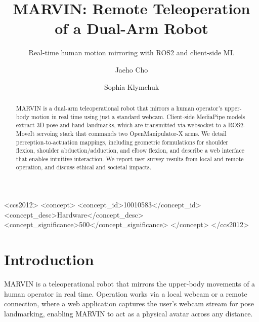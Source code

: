\documentclass[acmsmall, screen]{acmart}
\begin{document}
\title{MARVIN: Remote Teleoperation of a Dual-Arm Robot}
\subtitle{Real-time human motion mirroring with ROS2 and client-side ML}

\author{Jaeho Cho}
\author{Sophia Klymchuk}
\authornotemark[1]

\renewcommand{\shortauthors}{Cho and Klymchuk}

\begin{abstract}
MARVIN is a dual-arm teleoperational robot that mirrors a human operator's upper-body motion in real time using just a standard webcam. Client-side MediaPipe models extract 3D pose and hand landmarks, which are transmitted via websocket to a ROS2-MoveIt servoing stack that commands two OpenManipulator-X arms. We detail perception-to-actuation mappings, including geometric formulations for shoulder flexion, shoulder abduction/adduction, and elbow flexion, and describe a web interface that enables intuitive interaction. We report user survey results from local and remote operation, and discuss ethical and societal impacts.
\end{abstract}

\begin{CCSXML}
<ccs2012>
   <concept>
       <concept_id>10010583</concept_id>
       <concept_desc>Hardware</concept_desc>
       <concept_significance>500</concept_significance>
       </concept>
 </ccs2012>
\end{CCSXML}




\maketitle

\section{Introduction}
MARVIN is a teleoperational robot that mirrors the upper-body movements of a human operator in real time. Operation works via a local webcam or a remote connection, where a web application captures the user's webcam stream for pose landmarking, enabling MARVIN to act as a physical avatar across any distance.
\end{document}
